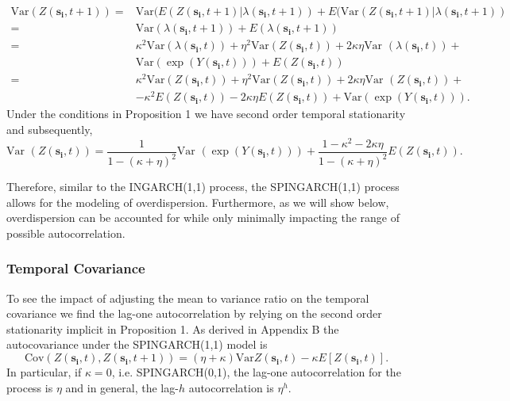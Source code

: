 \documentclass[11pt]{isuthesis}
\begin{document}
\begin{align}
	\mbox{Var}(Z(\boldsymbol{s_i},t+1))  =& \mbox{Var}(E(Z(\boldsymbol{s_i},t+1)|\lambda(\boldsymbol{s_i},t+1))+E(\mbox{Var}(Z(\boldsymbol{s_i},t+1)|\lambda(\boldsymbol{s_i},t+1))\\
	=& \mbox{Var}(\lambda(\boldsymbol{s_i},t+1))+ E(\lambda(\boldsymbol{s_i},t+1))\nonumber\\
	= & \kappa^2 \mbox{Var} (\lambda(\boldsymbol{s_i},t))+\eta^2 \mbox{Var}(Z(\boldsymbol{s_i},t))+2 \kappa \eta \mbox{Var }(\lambda(\boldsymbol{s_i},t))+\nonumber\\
	& \mbox{Var}(\exp(Y(\boldsymbol{s_i},t)))+E(Z(\boldsymbol{s_i},t))\\
	=&\kappa^2 \mbox{Var} (Z(\boldsymbol{s_i},t))+\eta^2 \mbox{Var}(Z(\boldsymbol{s_i},t))+2 \kappa \eta \mbox{Var }(Z(\boldsymbol{s_i},t))+\nonumber \nonumber\\
	& - \kappa^2 E(Z(\boldsymbol{s_i},t))-2 \kappa \eta E(Z(\boldsymbol{s_i},t))+\mbox{Var} (\exp(Y(\boldsymbol{s_i},t))).
\end{align}
Under the conditions in Proposition 1 we have second order temporal stationarity and subsequently,
\begin{equation}
	\mbox{Var }(Z(\boldsymbol{s_i},t))=\frac{1}{1-(\kappa+\eta)^2} \mbox{Var }(\exp(Y(\boldsymbol{s_i},t)))+\frac{1-\kappa^2-2\kappa \eta}{1-(\kappa+\eta)^2}E(Z(\boldsymbol{s_i},t)).
\end{equation}

Therefore, similar to the INGARCH(1,1) process, the SPINGARCH(1,1) process allows for the modeling of overdispersion.  Furthermore, as we will show below, overdispersion can be accounted for while only minimally impacting the range of possible autocorrelation.


\subsubsection{Temporal Covariance}

To see the impact of adjusting the mean to variance ratio on the temporal covariance we find the lag-one autocorrelation by relying on the second order stationarity implicit in Proposition 1.  As derived in Appendix B the autocovariance under the SPINGARCH(1,1) model is
\begin{equation}
	\mbox{Cov}(Z(\boldsymbol{s_i},t),Z(\boldsymbol{s_i},t+1))=\left(\eta+\kappa\right)\mbox{Var} Z(\boldsymbol{s_i},t)-\kappa E[Z(\boldsymbol{s_i},t)] \label{eq:Autocov}.
\end{equation}
In particular, if $\kappa=0$, i.e. SPINGARCH(0,1), the lag-one autocorrelation for the process is $\eta$ and in general, the lag-$h$ autocorrelation is $\eta^h$.  
\end{document}
